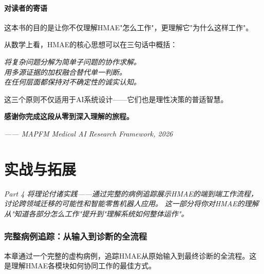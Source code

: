 \documentclass[11pt,a4paper]{ctexart}
\begin{document}
\subsection{对读者的寄语}

这本书的目的是让你不仅理解HMAE"怎么工作"，更理解它"为什么这样工作"。

从数学上看，HMAE的核心思想可以在三句话中概括：
\begin{center}
\textit{将复杂问题分解为简单子问题的协作求解。}\\
\textit{用多源证据的加权融合替代单一判断。}\\
\textit{在任何层面都保持对不确定性的诚实认知。}
\end{center}

这三个原则不仅适用于AI系统设计——它们也是理性决策的普适智慧。

\vspace{1cm}
\begin{center}
\Large\textbf{感谢你完成这段从零到深入理解的旅程。}

\vspace{0.5cm}
\textit{—— MAPFM Medical AI Research Framework, 2026}
\end{center}

\newpage


\part{实战与拓展}\vspace{18pt}
\vspace{6pt}
\begin{center}
\small
\textit{Part 4 将理论付诸实践——通过完整的病例追踪展示HMAE的端到端工作流程，讨论跨领域迁移的可能性和智能零售机器人应用。}
\textit{这一部分将你对HMAE的理解从"知道各部分怎么工作"提升到"理解系统如何整体运作"。}
\end{center}
\vspace{12pt}



\section{完整病例追踪：从输入到诊断的全流程}

本章通过一个完整的虚构病例，追踪HMAE从原始输入到最终诊断的全流程。这是理解HMAE各模块如何协同工作的最佳方式。
\end{document}
